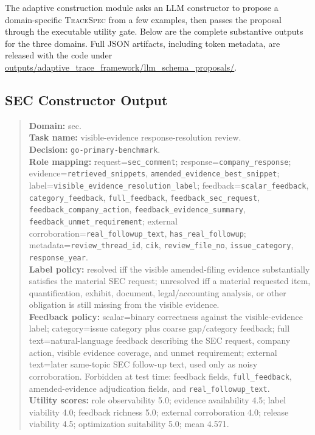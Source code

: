 \documentclass[11pt]{article}
\begin{document}
The adaptive construction module asks an LLM constructor to propose a domain-specific \textsc{TraceSpec} from a few examples, then passes the proposal through the executable utility gate. Below are the complete substantive outputs for the three domains. Full JSON artifacts, including token metadata, are released with the code under \url{outputs/adaptive_trace_framework/llm_schema_proposals/}.

\subsection{SEC Constructor Output}

\begin{quote}\small
\textbf{Domain:} sec. \\
\textbf{Task name:} visible-evidence response-resolution review. \\
\textbf{Decision:} \texttt{go-primary-benchmark}. \\
\textbf{Role mapping:} request=\texttt{sec\_comment}; response=\texttt{company\_response}; evidence=\texttt{retrieved\_snippets}, \texttt{amended\_evidence\_best\_snippet}; label=\texttt{visible\_evidence\_resolution\_label}; feedback=\texttt{scalar\_feedback}, \texttt{category\_feedback}, \texttt{full\_feedback}, \texttt{feedback\_sec\_request}, \texttt{feedback\_company\_action}, \texttt{feedback\_evidence\_summary}, \texttt{feedback\_unmet\_requirement}; external corroboration=\texttt{real\_followup\_text}, \texttt{has\_real\_followup}; metadata=\texttt{review\_thread\_id}, \texttt{cik}, \texttt{review\_file\_no}, \texttt{issue\_category}, \texttt{response\_year}. \\
\textbf{Label policy:} resolved iff the visible amended-filing evidence substantially satisfies the material SEC request; unresolved iff a material requested item, quantification, exhibit, document, legal/accounting analysis, or other obligation is still missing from the visible evidence. \\
\textbf{Feedback policy:} scalar=binary correctness against the visible-evidence label; category=issue category plus coarse gap/category feedback; full text=natural-language feedback describing the SEC request, company action, visible evidence coverage, and unmet requirement; external text=later same-topic SEC follow-up text, used only as noisy corroboration. Forbidden at test time: feedback fields, \texttt{full\_feedback}, amended-evidence adjudication fields, and \texttt{real\_followup\_text}. \\
\textbf{Utility scores:} role observability 5.0; evidence availability 4.5; label viability 4.0; feedback richness 5.0; external corroboration 4.0; release viability 4.5; optimization suitability 5.0; mean 4.571. \\

\end{quote}
\end{document}

